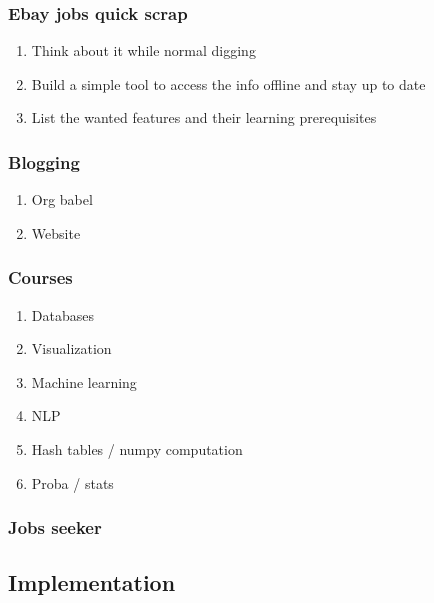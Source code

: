 \documentclass[11pt]{article}
\begin{document}
\subsubsection{Ebay jobs quick scrap}
\label{sec:orgda57c0a}
\begin{enumerate}
\item Think about it while normal digging
\label{sec:org2e91347}
\item Build a simple tool to access the info offline and stay up to date
\label{sec:org26cce1a}
\item List the wanted features and their learning prerequisites
\label{sec:org9c237d5}
\end{enumerate}
\subsubsection{Blogging}
\label{sec:org1e5d11a}
\begin{enumerate}
\item Org babel
\label{sec:org9ab00b4}
\item Website
\label{sec:org06edad6}
\end{enumerate}
\subsubsection{Courses}
\label{sec:org3ac302f}
\begin{enumerate}
\item Databases
\label{sec:org8719737}
\item Visualization
\label{sec:orgd466a07}
\item Machine learning
\label{sec:org2d15798}
\item NLP
\label{sec:orge12bc20}
\item Hash tables / numpy computation
\label{sec:org1a91e83}
\item Proba / stats
\label{sec:orge308461}
\end{enumerate}
\subsubsection{Jobs seeker}
\label{sec:org8b1294c}
\subsection{Implementation}
\label{sec:org6ea7b3a}
\end{document}

